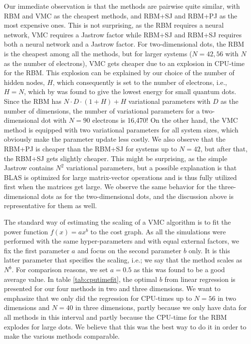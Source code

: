 Our immediate observation is that the methods are pairwise quite similar, with RBM and VMC as the cheapest methods, and RBM+SJ and RBM+PJ as the most expensive ones. This is not surprising, as the RBM requires a neural network, VMC requires a Jastrow factor while RBM+SJ and RBM+SJ requires both a neural network and a Jastrow factor. For two-dimensional dots, the RBM is the cheapest among all the methods, but for larger systems ($N=42,56$ with $N$ as the number of electrons), VMC gets cheaper due to an explosion in CPU-time for the RBM. This explosion can be explained by our choice of the number of hidden nodes, $H$, which consequently is set to the number of electrons, i.e., $H=N$, which by \citet{nordhagen_computational_2018} was found to give the lowest energy for small quantum dots. Since the RBM has $N\cdot D\cdot (1+H)+H$ variational parameters with $D$ as the number of dimensions, the number of variational parameters for a two-dimensional dot with $N=90$ electrons is 16,470! On the other hand, the VMC method is equipped with two variational parameters for all system sizes, which obviously make the parameter update less costly. We also observe that the RBM+PJ is cheaper than the RBM+SJ for systems up to $N=42$, but after that, the RBM+SJ gets slightly cheaper. This might be surprising, as the simple Jastrow contains $N^2$ variational parameters, but a possible explanation is that BLAS is optimized for large matrix-vector operations and is thus fully utilized first when the matrices get large. We observe the same behavior for the three-dimensional dots as for the two-dimensional dots, and the discussion above is representative for them as well.

The standard way of estimating the scaling of a VMC algorithm is to fit the power function $f(x)=ax^b$ to the cost graph. As all the simulations were performed with the same hyper-parameters and with equal external factors, we fix the first parameter $a$ and focus on the second parameter $b$ only. It is this latter parameter that specifies the scaling, i.e.; we say that the method scales as $N^b$. For comparison reasons, we set $a=0.5$ as this was found to be a good average value. In table \eqref{tab:cputimefit}, the optimal $b$ from linear regression is presented for our four methods in two and three dimensions. We want to emphasize that we only did the regression for CPU-times up to $N=56$ in two dimensions and $N=40$ in three dimensions, partly because we only have data for all methods in this interval and partly because the CPU-time for the RBM explodes for large dots. We believe that this was the best way to do it in order to make the various methods comparable. 

